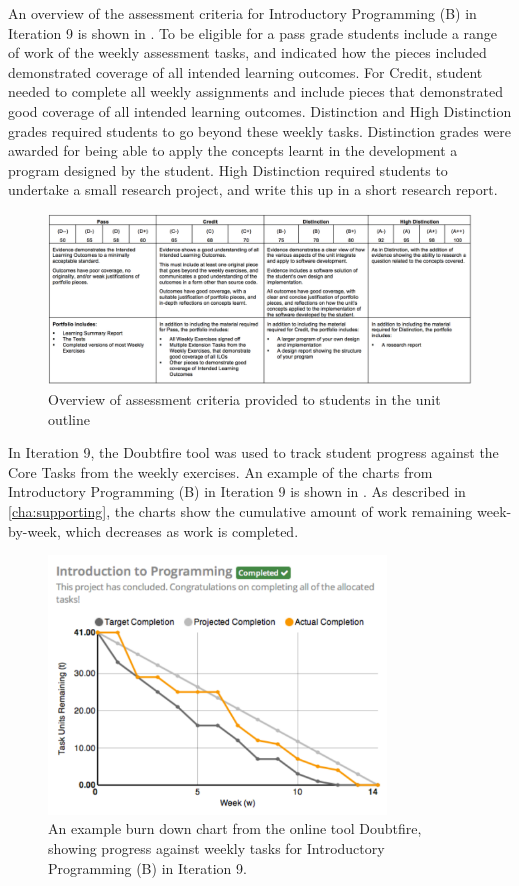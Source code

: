 An overview of the assessment criteria for Introductory Programming (B) in Iteration 9 is shown in . To be eligible for a pass grade students include a range of work of the weekly assessment tasks, and indicated how the pieces included demonstrated coverage of all intended learning outcomes. For Credit, student needed to complete all weekly assignments and include pieces that demonstrated good coverage of all intended learning outcomes. Distinction and High Distinction grades required students to go beyond these weekly tasks. Distinction grades were awarded for being able to apply the concepts learnt in the development a program designed by the student. High Distinction required students to undertake a small research project, and write this up in a short research report.

\begin{figure}[htbp]
  \centering
  \includegraphics[width=\textwidth]{AssessmentCriteria}
  \caption{Overview of assessment criteria provided to students in the unit outline}
  \label{fig:i9_assessment_criteria}
\end{figure}

In Iteration 9, the Doubtfire tool was used to track student progress against the Core Tasks from the weekly exercises. An example of the charts from Introductory Programming (B) in Iteration 9 is shown in . As described in \cref{cha:supporting}, the charts show the cumulative amount of work remaining week-by-week, which decreases as work is completed. 

\begin{figure}[thbp]
  \centering
  \includegraphics[width=0.8\textwidth]{ExampleChart}
  \caption{An example burn down chart from the online tool Doubtfire, showing progress against weekly tasks for Introductory Programming (B) in Iteration 9.}
  \label{fig:progress_example_chart} 
\end{figure}

